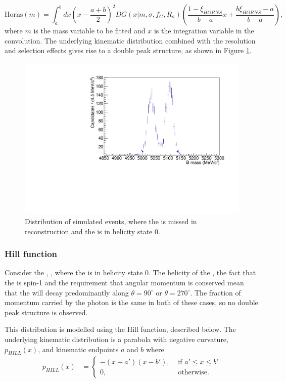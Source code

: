 \begin{equation}
\text{Horns}(m) = \int_a^b dx \left(x - \frac{a+b}{2}\right)^2 DG(x|m,\sigma,f_G,R_{\sigma}) \left( \frac{1 - \xi_{HORNS}}{b - a}x + \frac{b\xi_{HORNS} - a}{b - a}\right),
\label{eqn:horns}
\end{equation}
where $m$ is the mass variable to be fitted and $x$ is the integration variable in the convolution. The underlying kinematic distribution combined with the resolution and selection effects gives rise to a double peak structure, as shown in Figure \ref{fig:horns}.

\begin{figure}[h]
\centering
\includegraphics[width=0.5\linewidth]{figures/fitComponents/horns.pdf}
\caption{Distribution of simulated \decay{\Bm}{(\decay{\Dstarz}{\Dz\piz})\Kstarm} events, where the \piz is missed in reconstruction and the \Dstarz is in helicity state 0.}
\label{fig:horns}
\end{figure}

\subsubsection{Hill function}

Consider the \decay{\Bm}{\Dstarz\Kstarm}, \decay{\Dstarz}{\Dz\gamma}, where the \Dstarz is in helicity state 0. The helicity of the \Dstarz, the fact that the \Pgamma is spin-1 and the requirement that angular momentum is conserved mean that the \Pgamma will decay predominantly along $\theta = 90^{\circ}$ or $\theta = 270^{\circ}$. The fraction of momentum carried by the photon is the same in both of these cases, so no double peak structure is observed.

This distribution is modelled using the Hill function, described below. The underlying kinematic distribution is a parabola with negative curvature, $p_{HILL}(x)$, and kinematic endpoints $a$ and $b$ where
\begin{align}
p_{HILL}(x) &= \begin{cases}
-(x - a')(x - b'), & \text{ if $a' \leq x \leq b'$}\\ 	
0, & \text{ otherwise.}
\end{cases} 
\end{align}

